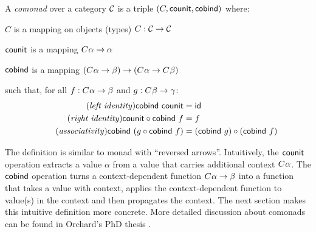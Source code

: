 \begin{definition}
A \emph{comonad} over a category $\mathcal{C}$ is a triple $(C, \textnormal{\sffamily counit}, \textnormal{\sffamily cobind})$ where:
\begin{compactitem}
\item $C$ is a mapping on objects (types) $C : \mathcal{C} \rightarrow \mathcal{C}$
\item $\textnormal{\sffamily counit}$ is a mapping $C^{}\alpha \rightarrow \alpha$ 
\item $\textnormal{\sffamily cobind}$ is a mapping $(C^{}\alpha \rightarrow \beta) 
  \rightarrow (C^{}\alpha \rightarrow C^{}\beta)$
\end{compactitem}
such that, for all $f:C^{}\alpha \rightarrow \beta$ and $g:C^{}\beta \rightarrow \gamma$:
\begin{align}
\tag{\emph{left identity}}
  \ident{cobind}~\ident{counit} &= \idf{}
  \\
\tag{\emph{right identity}}
  \ident{counit} \circ \ident{cobind}~f &= f
  \\
\tag{\emph{associativity}}
  \ident{cobind}~(g \circ \ident{cobind}~f) &= (\ident{cobind}~g) \circ (\ident{cobind}~f)
\end{align}
\end{definition}


\noindent
The definition is similar to monad with ``reversed arrows''. Intuitively, the $\textnormal{\sffamily counit}$ 
operation extracts a value $\alpha$ from a value that carries additional context $C^{}\alpha$.
The $\textnormal{\sffamily cobind}$ operation turns a context-dependent function 
$C^{}\alpha \rightarrow \beta$ into a function that takes a value with context, applies
the context-dependent function to value(s) in the context and then propagates the context. The 
next section makes this intuitive definition more concrete. More detailed discussion about
comonads can be found in Orchard's PhD thesis \cite{comonads-dom-thesis}.



